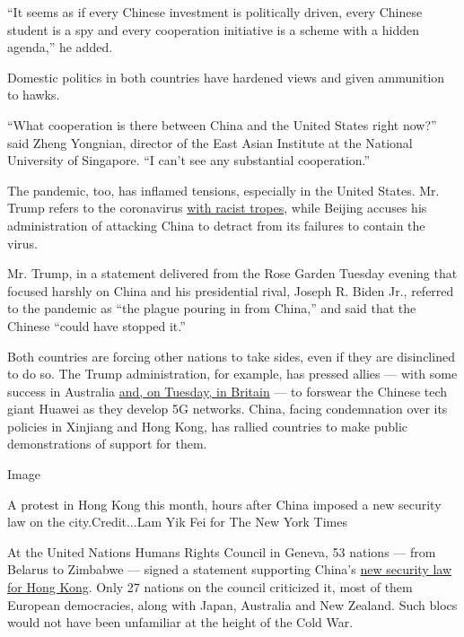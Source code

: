 ``It seems as if every Chinese investment is politically driven, every
Chinese student is a spy and every cooperation initiative is a scheme
with a hidden agenda,'' he added.

Domestic politics in both countries have hardened views and given
ammunition to hawks.

``What cooperation is there between China and the United States right
now?'' said Zheng Yongnian, director of the East Asian Institute at the
National University of Singapore. ``I can't see any substantial
cooperation.''

The pandemic, too, has inflamed tensions, especially in the United
States. Mr. Trump refers to the coronavirus
\href{https://www.nytimes.com/2020/06/23/us/politics/trump-race-racism-protests.html}{with
racist tropes}, while Beijing accuses his administration of attacking
China to detract from its failures to contain the virus.

Mr. Trump, in a statement delivered from the Rose Garden Tuesday evening
that focused harshly on China and his presidential rival, Joseph R.
Biden Jr., referred to the pandemic as ``the plague pouring in from
China,'' and said that the Chinese ``could have stopped it.''

Both countries are forcing other nations to take sides, even if they are
disinclined to do so. The Trump administration, for example, has pressed
allies --- with some success in Australia
\href{https://www.nytimes.com/2020/07/14/business/uk-bans-huawei-from-5g-network-raising-tensions-with-china.html}{and,
on Tuesday, in Britain} --- to forswear the Chinese tech giant Huawei as
they develop 5G networks. China, facing condemnation over its policies
in Xinjiang and Hong Kong, has rallied countries to make public
demonstrations of support for them.

Image

A protest in Hong Kong this month, hours after China imposed a new
security law on the city.Credit...Lam Yik Fei for The New York Times

At the United Nations Humans Rights Council in Geneva, 53 nations ---
from Belarus to Zimbabwe --- signed a statement supporting China's
\href{https://www.nytimes.com/2020/06/29/world/asia/china-hong-kong-security-law-rules.html}{new
security law for Hong Kong}. Only 27 nations on the council criticized
it, most of them European democracies, along with Japan, Australia and
New Zealand. Such blocs would not have been unfamiliar at the height of
the Cold War.


